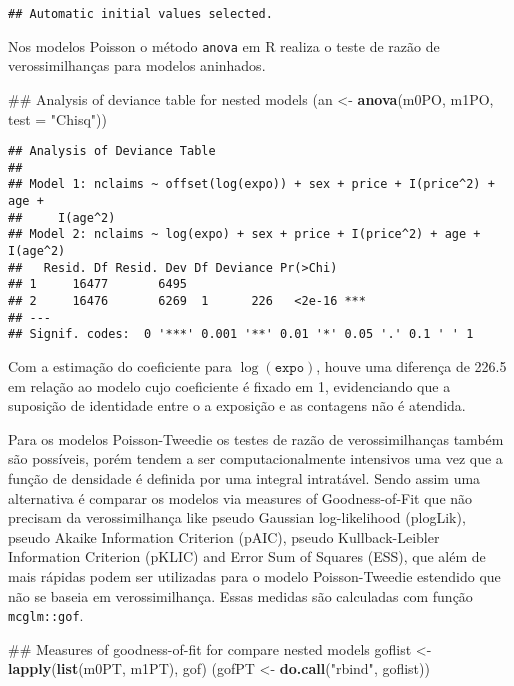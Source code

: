 \documentclass[9pt,a5paper,]{book}
\newenvironment{Shaded}{}{}
\newcommand{\KeywordTok}[1]{\textbf{{#1}}}
\newcommand{\DataTypeTok}[1]{\underline{{#1}}}
\newcommand{\StringTok}[1]{{#1}}
\newcommand{\NormalTok}[1]{{#1}}
\renewenvironment{Shaded}{\color{inputcolor}}{}
\renewcommand{\DataTypeTok}[1]{{#1}}
\theoremstyle{definition}
\theoremstyle{definition}
\theoremstyle{remark}
\begin{document}
\begin{verbatim}
## Automatic initial values selected.
\end{verbatim}

Nos modelos Poisson o método \texttt{anova} em R realiza o teste de
razão de verossimilhanças para modelos aninhados.

\begin{Shaded}
\begin{Highlighting}[]
\NormalTok{## Analysis of deviance table for nested models}
\NormalTok{(an <-}\StringTok{ }\KeywordTok{anova}\NormalTok{(m0PO, m1PO, }\DataTypeTok{test =} \StringTok{"Chisq"}\NormalTok{))}
\end{Highlighting}
\end{Shaded}

\begin{verbatim}
## Analysis of Deviance Table
## 
## Model 1: nclaims ~ offset(log(expo)) + sex + price + I(price^2) + age + 
##     I(age^2)
## Model 2: nclaims ~ log(expo) + sex + price + I(price^2) + age + I(age^2)
##   Resid. Df Resid. Dev Df Deviance Pr(>Chi)    
## 1     16477       6495                         
## 2     16476       6269  1      226   <2e-16 ***
## ---
## Signif. codes:  0 '***' 0.001 '**' 0.01 '*' 0.05 '.' 0.1 ' ' 1
\end{verbatim}

Com a estimação do coeficiente para \(\log(\texttt{expo})\), houve uma
diferença de 226.5 em relação ao modelo cujo coeficiente é fixado em 1,
evidenciando que a suposição de identidade entre o a exposição e as
contagens não é atendida.

Para os modelos Poisson-Tweedie os testes de razão de verossimilhanças
também são possíveis, porém tendem a ser computacionalmente intensivos
uma vez que a função de densidade é definida por uma integral
intratável. Sendo assim uma alternativa é comparar os modelos via
measures of Goodness-of-Fit que não precisam da verossimilhança like
pseudo Gaussian log-likelihood (plogLik), pseudo Akaike Information
Criterion (pAIC), pseudo Kullback-Leibler Information Criterion (pKLIC)
and Error Sum of Squares (ESS), que além de mais rápidas podem ser
utilizadas para o modelo Poisson-Tweedie estendido que não se baseia em
verossimilhança. Essas medidas são calculadas com função
\texttt{mcglm::gof}.

\begin{Shaded}
\begin{Highlighting}[]
\NormalTok{## Measures of goodness-of-fit for compare nested models}
\NormalTok{goflist <-}\StringTok{ }\KeywordTok{lapply}\NormalTok{(}\KeywordTok{list}\NormalTok{(m0PT, m1PT), gof)}
\NormalTok{(gofPT <-}\StringTok{ }\KeywordTok{do.call}\NormalTok{(}\StringTok{"rbind"}\NormalTok{, goflist))}
\end{Highlighting}
\end{Shaded}
\end{document}
